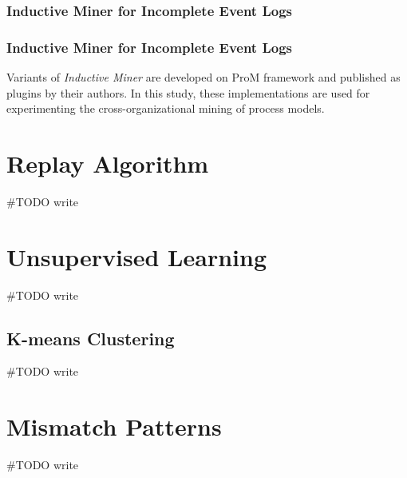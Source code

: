 \subsubsection{Inductive Miner for Incomplete Event Logs}
\label{sec:inductive-miner-incomplete}
\cite{leemans2014discoveringincomplete}

\subsubsection{Inductive Miner for Incomplete Event Logs}
\label{sec:inductive-miner-incomplete}
\cite{weidlich2012profiles}

Variants of \textit{Inductive Miner} are developed on ProM framework \cite{verbeek2010prom} and published as plugins by their authors. In this study, these implementations are used for experimenting the cross-organizational mining of process models.


\section{Replay Algorithm}
\label{sec:replay-algorithm}
#TODO write

\section{Unsupervised Learning}
\label{sec:unsupervised-learning}
#TODO write

\subsection{K-means Clustering}
\label{sec:kmeans-clustering}
#TODO write

\section{Mismatch Patterns}
\label{sec:mismatch-patterns}
#TODO write